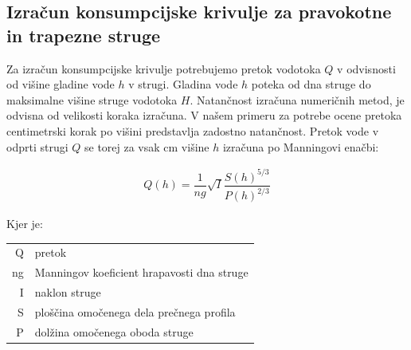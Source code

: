\subsection{Izračun konsumpcijske krivulje za pravokotne in trapezne struge} \label{sec:teorija_trapeznaMetoda}
Za izračun konsumpcijske krivulje potrebujemo pretok vodotoka $Q$ v odvisnosti od višine gladine vode $h$ v strugi. Gladina vode $h$ poteka od dna struge do maksimalne višine struge vodotoka $H$. Natančnost izračuna numeričnih metod, je odvisna od velikosti koraka izračuna. V našem primeru za potrebe ocene pretoka centimetrski korak po višini predstavlja zadostno natančnost. Pretok vode v odprti strugi $Q$ se torej za vsak cm višine $h$ izračuna po Manningovi enačbi: 

\begin{ceqn}
\begin{align}
Q(h) = \dfrac{1}{ng} \sqrt{I}\dfrac{S(h)^{5/3}}{P(h)^{2/3}} \label{eq:ManningovaEnacba}
\end{align}
\end{ceqn}

Kjer je:

\begin{table}[htb!]
	\begin{tabular}{r|p{10cm}}
		Q & pretok \\
		ng & Manningov koeficient hrapavosti dna struge\\
		I & naklon struge \\
		S & ploščina omočenega dela prečnega profila \\
		P & dolžina omočenega oboda struge
	\end{tabular}
\end{table}


